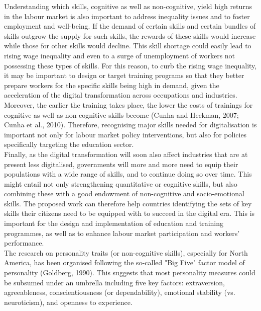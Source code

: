 Understanding which skills, cognitive as well as non-cognitive, yield high returns in the labour market is also important to address inequality issues and to foster employment and well-being. If the demand of certain skills and certain bundles of skills outgrow the supply for such skills, the rewards of these skills would increase while those for other skills would decline. This skill shortage could easily lead to rising wage inequality and even to a surge of unemployment of workers not possessing these types of skills. For this reason, to curb the rising wage inequality, it may be important to design or target training programs so that they better prepare workers for the specific skills being high in demand, given the acceleration of the digital transformation across occupations and industries. Moreover, the earlier the training takes place, the lower the costs of trainings for cognitive as well as non-cognitive skills become (Cunha and Heckman, 2007; Cunha et al., 2010). Therefore, recognising major skills needed for digitalisation is important not only for labour market policy interventions, but also for policies specifically targeting the education sector.\\

Finally, as the digital transformation will soon also affect industries that are at present less digitalised, governments will more and more need to equip their populations with a wide range of skills, and to continue doing so over time. This might entail not only strengthening quantitative or cognitive skills, but also combining these with a good endowment of non-cognitive and socio-emotional skills. The proposed work can therefore help countries identifying the sets of key skills their citizens need to be equipped with to succeed in the digital era. This is important for the design and implementation of education and training programmes, as well as to enhance labour market participation and workers’ performance.\\

The research on personality traits (or non-cognitive skills), especially for North America, has been organised following the so-called "Big Five" factor model of personality (Goldberg, 1990). This suggests that most personality measures could be subsumed under an umbrella including five key factors:
extraversion, agreeableness, conscientiousness (or dependability), emotional stability (vs. neuroticism), and openness to experience.\\







